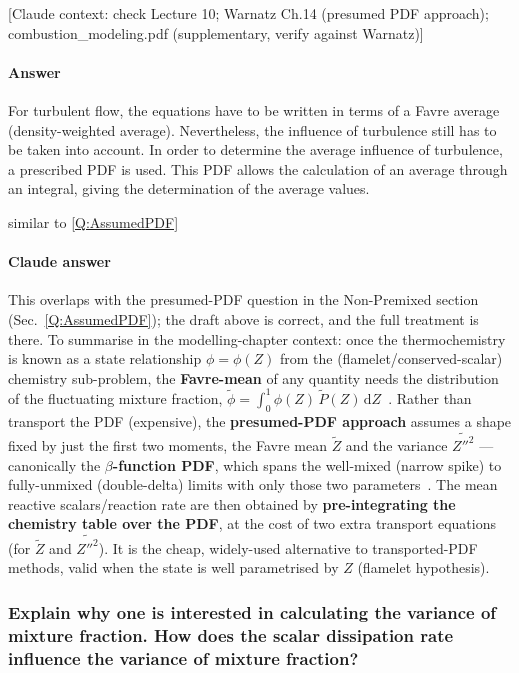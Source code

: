 {\color{gray}\footnotesize [Claude context: check Lecture 10; Warnatz Ch.14 (presumed PDF approach); combustion\_modeling.pdf (supplementary, verify against Warnatz)]}

\paragraph{Answer}

For turbulent flow, the equations have to be written in terms of a Favre average (density-weighted average). Nevertheless, the influence of turbulence still has to be taken into account. In order to determine the average influence of turbulence, a prescribed PDF is used. This PDF allows the calculation of an average through an integral, giving the determination of the average values.


similar to \ref{Q:AssumedPDF}

{\color{istblue}
\paragraph{Claude answer}
This overlaps with the presumed-PDF question in the Non-Premixed section (Sec.~\ref{Q:AssumedPDF}); the draft above is correct, and the full treatment is there. To summarise in the modelling-chapter context: once the thermochemistry is known as a state relationship $\phi=\phi(Z)$ from the (flamelet/conserved-scalar) chemistry sub-problem, the \textbf{Favre-mean} of any quantity needs the distribution of the fluctuating mixture fraction, $\tilde\phi = \int_0^1 \phi(Z)\,\tilde P(Z)\,\mathrm{d}Z$~\cite{lecture10,veynante2002turbulent}. Rather than transport the PDF (expensive), the \textbf{presumed-PDF approach} assumes a shape fixed by just the first two moments, the Favre mean $\tilde Z$ and the variance $\widetilde{Z''^2}$ --- canonically the \textbf{$\beta$-function PDF}, which spans the well-mixed (narrow spike) to fully-unmixed (double-delta) limits with only those two parameters~\cite{lecture10,peters2000turbulent}. The mean reactive scalars/reaction rate are then obtained by \textbf{pre-integrating the chemistry table over the PDF}, at the cost of two extra transport equations (for $\tilde Z$ and $\widetilde{Z''^2}$). It is the cheap, widely-used alternative to transported-PDF methods, valid when the state is well parametrised by $Z$ (flamelet hypothesis).
}




\subsubsection{Explain why one is interested in calculating the variance of mixture fraction. How does the scalar dissipation rate influence the variance of mixture fraction?}

